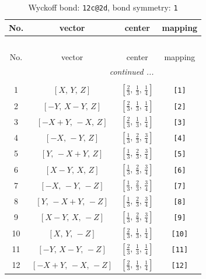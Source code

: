 \documentclass[fleqn,8pt]{jsarticle}
\begin{document}
\renewcommand{\arraystretch}{1.2}
\begin{longtable}{cccc}
\caption{Wyckoff bond: {\tt 12c@2d}, bond symmetry: {\tt 1}}
 \\
 \hline \hline
No. & vector & center & mapping \\ \hline \endfirsthead

\multicolumn{3}{l}{\tablename\ \thetable{}} \\
 \hline \hline
No. & vector & center & mapping \\ \hline \endhead

 \hline \hline
\multicolumn{3}{r}{\footnotesize\it continued ...} \\ \endfoot

 \hline \hline
\multicolumn{3}{r}{} \\ \endlastfoot

1 & $\left[ X,\, Y,\, Z \right]$ & $\left[ \frac{2}{3},\, \frac{1}{3},\, \frac{1}{4} \right]$ & {\tt [1]} \\ \hline
2 & $\left[ - Y,\, X - Y,\, Z \right]$ & $\left[ \frac{2}{3},\, \frac{1}{3},\, \frac{1}{4} \right]$ & {\tt [2]} \\ \hline
3 & $\left[ - X + Y,\, - X,\, Z \right]$ & $\left[ \frac{2}{3},\, \frac{1}{3},\, \frac{1}{4} \right]$ & {\tt [3]} \\ \hline
4 & $\left[ - X,\, - Y,\, Z \right]$ & $\left[ \frac{1}{3},\, \frac{2}{3},\, \frac{3}{4} \right]$ & {\tt [4]} \\ \hline
5 & $\left[ Y,\, - X + Y,\, Z \right]$ & $\left[ \frac{1}{3},\, \frac{2}{3},\, \frac{3}{4} \right]$ & {\tt [5]} \\ \hline
6 & $\left[ X - Y,\, X,\, Z \right]$ & $\left[ \frac{1}{3},\, \frac{2}{3},\, \frac{3}{4} \right]$ & {\tt [6]} \\ \hline
7 & $\left[ - X,\, - Y,\, - Z \right]$ & $\left[ \frac{1}{3},\, \frac{2}{3},\, \frac{3}{4} \right]$ & {\tt [7]} \\ \hline
8 & $\left[ Y,\, - X + Y,\, - Z \right]$ & $\left[ \frac{1}{3},\, \frac{2}{3},\, \frac{3}{4} \right]$ & {\tt [8]} \\ \hline
9 & $\left[ X - Y,\, X,\, - Z \right]$ & $\left[ \frac{1}{3},\, \frac{2}{3},\, \frac{3}{4} \right]$ & {\tt [9]} \\ \hline
10 & $\left[ X,\, Y,\, - Z \right]$ & $\left[ \frac{2}{3},\, \frac{1}{3},\, \frac{1}{4} \right]$ & {\tt [10]} \\ \hline
11 & $\left[ - Y,\, X - Y,\, - Z \right]$ & $\left[ \frac{2}{3},\, \frac{1}{3},\, \frac{1}{4} \right]$ & {\tt [11]} \\ \hline
12 & $\left[ - X + Y,\, - X,\, - Z \right]$ & $\left[ \frac{2}{3},\, \frac{1}{3},\, \frac{1}{4} \right]$ & {\tt [12]} \\
\end{longtable}
\end{document}
